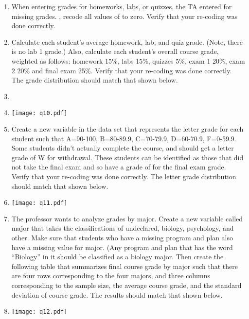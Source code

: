 \begin{enumerate}
\item When entering grades for homeworks, labs, or quizzes, the TA entered  for missing grades.  , recode all values of  to zero.   Verify that your re-coding was done correctly.
\item Calculate each student's average homework, lab, and quiz grade. (Note, there is no lab 1 grade.)  Also, calculate each student's overall course grade, weighted as follows:  homework 15\%, labs 15\%, quizzes 5\%, exam 1 20\%, exam 2 20\% and final exam 25\%.  Verify that your re-coding was done correctly.  The grade distribution should match that shown below.  
\item[]\item[]\texttt{[image: q10.pdf]}
\item Create a new variable in the data set that represents the letter grade for each student such that A=90-100, B=80-89.9, C=70-79.9, D=60-70.9, F=0-59.9.  Some students didn't actually complete the course, and should get a letter grade of W for withdrawal.  These students can be identified as those that did not take the final exam and so have a grade of  for the final exam grade. Verify that your re-coding was done correctly.  The letter grade distribution should match that shown below.
\item[]\texttt{[image: q11.pdf]}
\item The professor wants to analyze grades by major.  Create a new variable called major that takes the classifications of undeclared, biology, psychology, and other.  Make sure that students who have a missing program and plan also have a missing value for major.  (Any program and plan that has the word ``Biology'' in it should be classified as a biology major.  Then create the following table that summarizes final course grade by major such that there are four rows corresponding to the four majors, and three columns corresponding to the sample size, the average course grade, and the standard deviation of course grade.  The results should match that shown below.
\item[]
\texttt{[image: q12.pdf]}

\end{enumerate}
